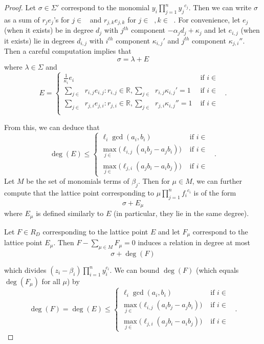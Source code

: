 \documentclass{amsart}
\theoremstyle{plain}
\theoremstyle{definition}
\theoremstyle{remark}
\numberwithin{equation}{section}
\newcommand\br{{\mathbb R}}
\newcommand\bida{a}
\newcommand\bidb{b}
\DeclareMathOperator{\Te}{T_=}
\DeclareMathOperator{\Tp}{T_+}
\DeclareMathOperator{\Tm}{T_-}
\begin{document}
\begin{proof}
Let $\sigma\in \Sigma'$ correspond to the monomial $y_i \prod_{j=1}^n
{y_j}^{c_j}$.  Then we can write $\sigma$ as a sum of $r_j e_j$'s for $j\in
\Te$ and $r_{j,k}e_{j,k}$ for $j\in \Tp, k\in \Tm$.  
For convenience, let $e_j$ (when it exists) be in degree $d_j$ with $j^{th}$
component $-\alpha_j d_j + \kappa_j$ and let $e_{i,j}$ (when it exists) lie in
degrees $d_{i,j}$ with $i^{th}$ component $\kappa_{i,j}'$ and $j^{th}$
component $\kappa_{j,i}''$.
Then a careful computation implies that 
\[
	\sigma = \lambda + E
\]
where $\lambda \in \Sigma$ and
\begin{equation}\label{eqn:hirz-E-translation}
	E = \begin{cases}
	\frac{1}{\kappa_i} e_i  	&  \mbox{ if }i\in \Te\\
	\sum_{j\in \Tm} r_{i,j} e_{i,j}: r_{i,j}\in \br, \sum_{j\in \Tm} r_{i,j}\kappa_{i,j}' = 1 & \mbox{ if } i\in \Tp\\
	\sum_{j\in \Tp} r_{j,i} e_{j,i}: r_{j,i} \in \br, \sum_{j\in \Tm} r_{j,i} \kappa_{i,j}'' = 1 	& \mbox{ if } i\in \Tm\\
	\end{cases}.
\end{equation}

\noindent
From this, we can deduce that
\[
	\deg(E) \le \begin{cases}
	\ell_i \gcd(\bida_i, \bidb_i)	&\mbox{ if } i \in \Te \\
	\max_{j \in \Tm} \bigl(\ell_{i, j} (\bida_i \bidb_j - \bida_j \bidb_i)\bigr)
	&\mbox{ if } i \in \Tp \\
	\max_{j \in \Tp} \bigl(\ell_{j, i} (\bida_j \bidb_ i - \bida_i \bidb_j) \bigr)
	&\mbox{ if } i \in \Tm \end{cases}.
\]
Let $M$ be the set of monomials terms of $\beta_j$.  Then for $\mu\in M$, we
can further compute that the lattice point corresponding to $\mu \prod_{j=1}^n
{f_i}^{c_i}$ is of the form
\[
	\sigma + E_\mu
\]
where $E_\mu$ is defined similarly to $E$ (in particular, they lie in the same degree).

Let $F\in R_D$ corresponding to the lattice point $E$ and let $F_\mu$ correspond to the lattice point $E_\mu$.  
Then $F - \sum_{\mu \in M} F_\mu = 0$ induces a
relation in degree at most
\[
	\sigma + \deg(F)
\]

\noindent
which divides $(z_i - \beta_i) \prod_{i = 1}^n y_i^{c_i}$.
We can bound $\deg(F)$ (which equals $\deg(F_\mu)$ for all $\mu$) by
\[
	\deg(F) = \deg(E) \le \begin{cases}
	\ell_i \gcd(\bida_i, \bidb_i)	&\mbox{ if } i \in \Te \\
	\max_{j \in \Tm} \bigl(\ell_{i, j} (\bida_i \bidb_j - \bida_j \bidb_i)\bigr)
	&\mbox{ if } i \in \Tp \\
	\max_{j \in \Tp} \bigl(\ell_{j, i} (\bida_j \bidb_ i - \bida_i \bidb_j) \bigr)
	&\mbox{ if } i \in \Tm \end{cases}.
\]


\end{proof}
\end{document}
